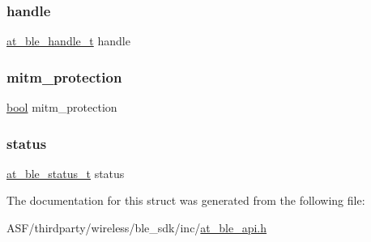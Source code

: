 \mbox{\label{structat__ble__slave__sec__request__t_ab8b0f353cb6a8d85f0822900e3b7cf35}} 
\subsubsection{\texorpdfstring{handle}{handle}}
{\footnotesize\ttfamily \mbox{\hyperlink{at__ble__api_8h_abd23646d0c662860741f787efc8456f2}{at\+\_\+ble\+\_\+handle\+\_\+t}} handle}

\mbox{\label{structat__ble__slave__sec__request__t_a0430e2654fcb685cbe7fe84688c4a6bc}} 
\subsubsection{\texorpdfstring{mitm\_protection}{mitm\_protection}}
{\footnotesize\ttfamily \mbox{\hyperlink{group__group__sam0__utils_ga97a80ca1602ebf2303258971a2c938e2}{bool}} mitm\+\_\+protection}

\mbox{\label{structat__ble__slave__sec__request__t_a0b48093fc2030779fc47e5216f8019e2}} 
\subsubsection{\texorpdfstring{status}{status}}
{\footnotesize\ttfamily \mbox{\hyperlink{group__error__codes__group_ga3b1db9b95feb157b3c188ca27fe76988}{at\+\_\+ble\+\_\+status\+\_\+t}} status}



The documentation for this struct was generated from the following file\+:\begin{DoxyCompactItemize}
\item 
A\+S\+F/thirdparty/wireless/ble\+\_\+sdk/inc/\mbox{\hyperlink{at__ble__api_8h}{at\+\_\+ble\+\_\+api.\+h}}\end{DoxyCompactItemize}
